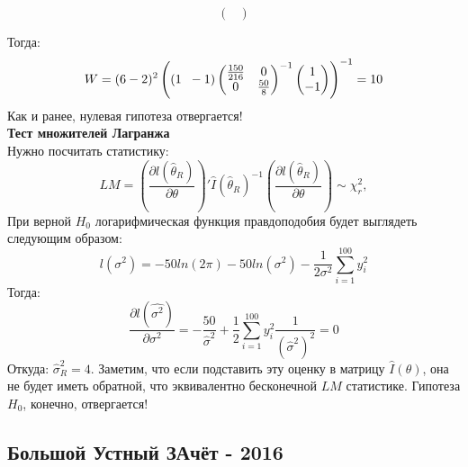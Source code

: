 \documentclass[12pt, a4paper]{article}\usepackage[]{graphicx}\usepackage[]{color}
\begin{document}
\begin{enumerate}
\[\begin{pmatrix}
\end{pmatrix}
\]

Тогда:
\[
W = (6-2)^2\left((1 \hspace{2mm} -1) \begin{pmatrix}
\frac{150}{216} & 0 \\
0 & \frac{50}{8}
\end{pmatrix}^{-1}
 \begin{pmatrix}
1 \\
-1
\end{pmatrix} \right)^{-1} = 10
\]
Как и ранее, нулевая гипотеза отвергается! \\
\textbf{Тест множителей Лагранжа}\\
Нужно посчитать статистику:
\[
LM = \left(\frac{\partial l(\hat{\theta}_R)}{\partial \theta}\right)'\hat{I}(\hat{\theta}_R)^{-1}\left(\frac{\partial l(\hat{\theta}_R)}{\partial \theta}\right) \sim \chi^2_r,
\]
При верной $H_0$ логарифмическая функция правдоподобия будет выглядеть следующим образом:
\[
l(\sigma^2) = -50ln(2\pi) - 50ln(\sigma^2) - \frac{1}{2\sigma^2}\sum \limits_{i=1}^{100}y_i^2
\]
Тогда:
\[
\frac{\partial l(\hat{\sigma^2})}{\partial \sigma^2} = -\frac{50}{\hat{\sigma}^2} + \frac{1}{2}\sum\limits_{i=1}^{100}y_i^2\frac{1}{(\hat{\sigma}^2)^2} = 0
\]
Откуда: $\hat{\sigma}^2_{R} = 4$. Заметим, что если подставить эту оценку в матрицу $\hat{I}(\theta)$, она не будет иметь обратной, что эквивалентно бесконечной $LM$ статистике. Гипотеза $H_0$, конечно, отвергается!

\end{enumerate}



\subsection{Большой Устный ЗАчёт - 2016}
\end{document}
